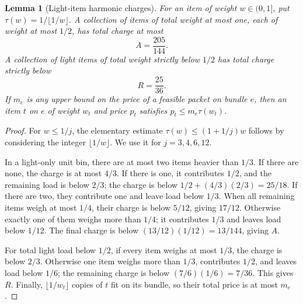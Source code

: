 \documentclass[11pt]{article}
\newtheorem{lemma}[theorem]{Lemma}
\theoremstyle{definition}\newtheorem{algorithm}{Algorithm}[section]
\numberwithin{equation}{section}
\theoremstyle{remark}\newtheorem*{remark}{Remark}
\begin{document}
\begin{lemma}[Light-item harmonic charges]
\label{lem:subtwo-light-charge}
For an item of weight $w\in(0,1]$, put
$\tau(w)=1/\lfloor1/w\rfloor$. A collection of items of total weight
at most one, each of weight at most $1/2$, has total charge at most
\[
 A=\frac{205}{144}.
\]
A collection of light items of total weight strictly below $1/2$ has
total charge strictly below
\[
 R=\frac{25}{36}.
\]
If $m_e$ is any upper bound on the price of a feasible packet on
bundle $e$, then an item $t$ on $e$ of weight $w_t$ and price $p_t$
satisfies
$p_t\le m_e\tau(w_t)$.
\end{lemma}
\begin{proof}
For $w\le1/j$, the elementary estimate
$\tau(w)\le(1+1/j)w$ follows by considering the integer
$\lfloor1/w\rfloor$. We use it for $j=3,4,6,12$.

In a light-only unit bin, there are at most two items heavier than
$1/3$. If there are none, the charge is at most $4/3$. If there is
one, it contributes $1/2$, and the remaining load is below $2/3$;
the charge is below $1/2+(4/3)(2/3)=25/18$. If there are two, they
contribute one and leave load below $1/3$. When all remaining items
weigh at most $1/4$, their charge is below $5/12$, giving $17/12$.
Otherwise exactly one of them weighs more than $1/4$; it contributes
$1/3$ and leaves load below $1/12$. The final charge is below
$(13/12)(1/12)=13/144$, giving $A$.

For total light load below $1/2$, if every item weighs at most $1/3$,
the charge is below $2/3$. Otherwise one item weighs more than
$1/3$, contributes $1/2$, and leaves load below $1/6$; the remaining
charge is below $(7/6)(1/6)=7/36$. This gives $R$. Finally,
$\lfloor1/w_t\rfloor$ copies of $t$ fit on its bundle, so their total
price is at most $m_e$.
\end{proof}
\end{document}
